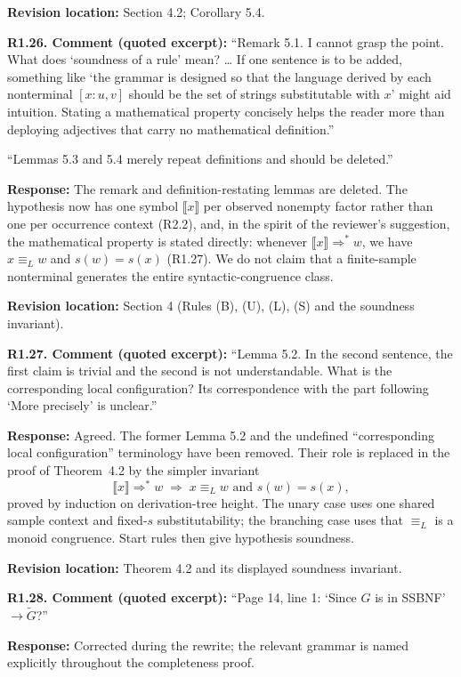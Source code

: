 \documentclass[
  10pt,
  a4paper,
]{article}
\newcommand{\NT}[1]{\llbracket #1\rrbracket}
\begin{document}
\textbf{Revision location:} Section 4.2; Corollary 5.4.


\textbf{R1.26. Comment (quoted excerpt):} ``Remark 5.1. I cannot grasp the
point. What does `soundness of a rule' mean? \ldots{} If one sentence is
to be added, something like `the grammar is designed so that the
language derived by each nonterminal \([x:u,v]\) should
be the set of strings substitutable with \(x\)' might aid intuition.
Stating a mathematical property concisely helps the reader more than
deploying adjectives that carry no mathematical definition.''

``Lemmas 5.3 and 5.4 merely repeat definitions and should be deleted.''

\textbf{Response:} The remark and definition-restating lemmas are
deleted. The hypothesis now has one symbol $\NT{x}$ per observed nonempty
factor rather than one per occurrence context (R2.2), and, in the spirit of
the reviewer's suggestion, the mathematical property is stated directly:
whenever $\NT{x}\Rightarrow^* w$, we have $x\equiv_L w$ and $s(w)=s(x)$
(R1.27). We do not claim that a finite-sample nonterminal generates the
entire syntactic-congruence class.

\textbf{Revision location:} Section 4 (Rules \textup{(B)}, \textup{(U)},
\textup{(L)}, \textup{(S)} and the soundness invariant).

\textbf{R1.27. Comment (quoted excerpt):} ``Lemma 5.2. In the second sentence,
the first claim is trivial and the second is not understandable. What is
the corresponding local configuration? Its correspondence with the part
following `More precisely' is unclear.''

\textbf{Response:} Agreed. The former Lemma 5.2 and the undefined
``corresponding local configuration'' terminology have been removed.
Their role is replaced in the proof of Theorem~4.2 by the simpler invariant
\[
 \NT{x}\Rightarrow^* w \;\Longrightarrow\; x\equiv_L w
 \text{ and } s(w)=s(x),
\]
proved by induction on derivation-tree height.  The unary case uses one shared
sample context and fixed-$s$ substitutability; the branching case uses that
$\equiv_L$ is a monoid congruence.  Start rules then give hypothesis
soundness.

\textbf{Revision location:} Theorem 4.2 and its displayed soundness invariant.


\textbf{R1.28. Comment (quoted excerpt):} ``Page 14, line 1: `Since \(G\) is in
SSBNF' \(\to\widetilde G\)?''

\textbf{Response:} Corrected during the rewrite; the relevant grammar is
named explicitly throughout the completeness proof.
\end{document}
